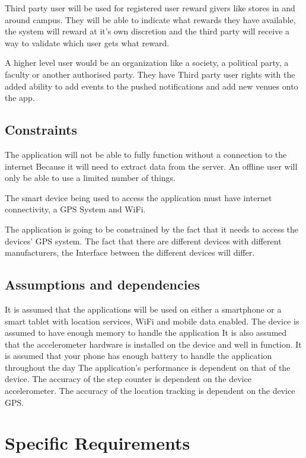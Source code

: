 \documentclass[11pt]{article}
\begin{document}
      Third party user will be used for registered user reward givers like stores in and around campus. They will be able to 			indicate what rewards they have available, the system will reward at it’s own discretion and the third party will 			receive a way to validate which user gets what reward.

      A higher level user would be an organization like a society, a political party, a faculty or another authorised party. 
      They have Third party user rights with the added ability to add events to the pushed notifications and add new venues 			onto the app.

      \subsection{Constraints}
      The application will not be able to fully function without a connection to the internet Because it will need to extract 		data from the server. An offline user will only be able to use a limited number of things.

      The smart device being used to access the application must have internet connectivity, a GPS 
      System and WiFi.

      The application is going to be constrained by the fact that it needs to access the devices’ 
      GPS system. The fact that there are different devices with different manufacturers, the Interface between the different 		devices will differ.

      \subsection{Assumptions and dependencies}
      It is assumed that the applications will be used on either a smartphone or a smart tablet with location services, WiFi 			and mobile data enabled.
      The device is assumed to have enough memory to handle the application
      It is also assumed that the accelerometer hardware is installed on the device and well in function.
      It is assumed that your phone has enough battery to handle the application throughout the day
      The application’s performance is dependent on that of the device.
      The accuracy of the step counter is dependent on the device accelerometer.
      The accuracy of the location tracking is dependent on the device GPS.

	\section{Specific Requirements}
	
\end{document}
